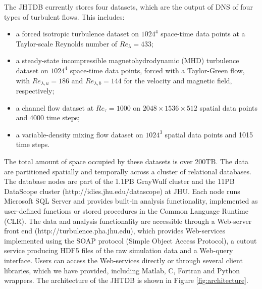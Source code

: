 \documentclass[10pt,twocolumn]{article}
\begin{document}
The JHTDB currently stores four datasets, which are the output of DNS of four types of turbulent flows. This includes: 
\begin{itemize}
\item a forced isotropic turbulence dataset on $1024^4$ space-time data points at a Taylor-scale Reynolds number of $Re_{\lambda} = 433$;
\item a steady-state incompressible magnetohydrodynamic (MHD) turbulence dataset on $1024^4$  space-time data points, forced with a Taylor-Green flow,
with $Re_{\lambda , u} = 186$  and $Re_{\lambda , b} = 144$ for the velocity and magnetic field, respectively;
\item a channel flow dataset at $Re_\tau = 1000$ on $2048 \times 1536 \times 512$ spatial data points and 4000 time steps;
\item a variable-density mixing flow dataset on $1024^3$ spatial data points and 1015 time steps.
\end{itemize}
The total amount of space occupied by these datasets is over 200TB. The data are partitioned spatially and temporally across a cluster of relational
databases. The database nodes are part of the 1.1PB GrayWulf cluster and the 11PB DataScope cluster (http://idies.jhu.edu/datascope) at JHU.
Each node runs Microsoft SQL Server and provides built-in analysis functionality, implemented as user-defined functions or stored procedures in the
Common Language Runtime (CLR). The data and analysis functionality are accessible through a Web-server front end (http://turbulence.pha.jhu.edu), 
which provides Web-services implemented using the SOAP protocol (Simple Object Access Protocol), a cutout service producing HDF5 files of the raw
simulation data and a Web-query interface. Users can access the Web-services directly or through several client libraries, which we have provided, 
including Matlab, C, Fortran and Python wrappers. The architecture of the JHTDB is shown in Figure \ref{fig:architecture}.
\end{document}

